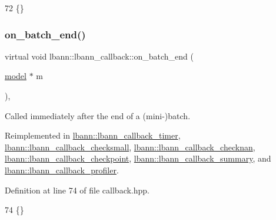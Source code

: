 \begin{DoxyCode}
72 \{\}
\end{DoxyCode}
\mbox{\label{classlbann_1_1lbann__callback_a895ca577e358601fcae5c04749f60535}} 
\subsubsection{\texorpdfstring{on\+\_\+batch\+\_\+end()}{on\_batch\_end()}}
{\footnotesize\ttfamily virtual void lbann\+::lbann\+\_\+callback\+::on\+\_\+batch\+\_\+end (\begin{DoxyParamCaption}\item[{\hyperlink{classlbann_1_1model}{model} $\ast$}]{m }\end{DoxyParamCaption})\hspace{0.3cm}{\ttfamily [inline]}, {\ttfamily [virtual]}}

Called immediately after the end of a (mini-\/)batch. 

Reimplemented in \hyperlink{classlbann_1_1lbann__callback__timer_aff885381753dfc63709531aebc827b0e}{lbann\+::lbann\+\_\+callback\+\_\+timer}, \hyperlink{classlbann_1_1lbann__callback__checksmall_a00f1e6ad712638a107667a3e6695a6f0}{lbann\+::lbann\+\_\+callback\+\_\+checksmall}, \hyperlink{classlbann_1_1lbann__callback__checknan_a1d1b3b082aa49016e7b80e0f267575da}{lbann\+::lbann\+\_\+callback\+\_\+checknan}, \hyperlink{classlbann_1_1lbann__callback__checkpoint_a476527e2b7b44dd3623e01f63ddb5f78}{lbann\+::lbann\+\_\+callback\+\_\+checkpoint}, \hyperlink{classlbann_1_1lbann__callback__summary_a89b18186fdaa7b6a7a0e9ab8ee334d88}{lbann\+::lbann\+\_\+callback\+\_\+summary}, and \hyperlink{classlbann_1_1lbann__callback__profiler_ad7db0233f3a0c91c10a15d0951bb1747}{lbann\+::lbann\+\_\+callback\+\_\+profiler}.



Definition at line 74 of file callback.\+hpp.


\begin{DoxyCode}
74 \{\}
\end{DoxyCode}
\mbox{\label{classlbann_1_1lbann__callback_a3462e54126adbd0082c22c98d8de5468}} 
